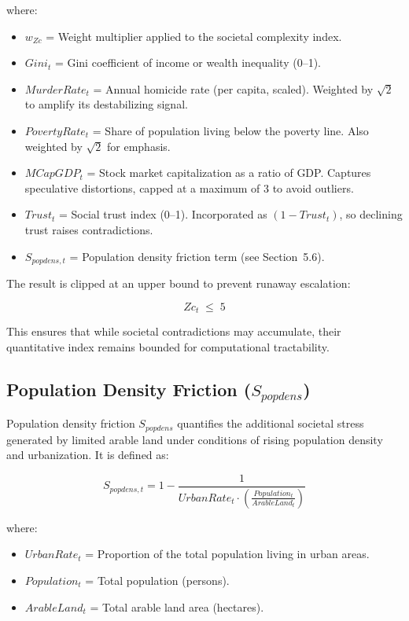 \documentclass[12pt,a4paper]{article}
\begin{document}
\noindent where:
\begin{itemize}
    \item $w_{Zc}$ = Weight multiplier applied to the societal complexity index.
    \item $Gini_t$ = Gini coefficient of income or wealth inequality (0–1).
    \item $MurderRate_t$ = Annual homicide rate (per capita, scaled). 
          Weighted by $\sqrt{2}$ to amplify its destabilizing signal.
    \item $PovertyRate_t$ = Share of population living below the poverty line. 
          Also weighted by $\sqrt{2}$ for emphasis.
    \item $MCapGDP_t$ = Stock market capitalization as a ratio of GDP. 
          Captures speculative distortions, capped at a maximum of $3$ to avoid outliers.
    \item $Trust_t$ = Social trust index (0–1). Incorporated as $(1 - Trust_t)$, 
          so declining trust raises contradictions.
    \item $S_{popdens,t}$ = Population density friction term (see Section~5.6).
\end{itemize}

\noindent The result is clipped at an upper bound to prevent runaway escalation:

\begin{equation}
Zc_t \; \leq \; 5
\end{equation}

\noindent This ensures that while societal contradictions may accumulate, their 
quantitative index remains bounded for computational tractability.
\subsection{Population Density Friction (\texorpdfstring{$S_{popdens}$}{Spopdens})}

Population density friction $S_{popdens}$ quantifies the additional societal stress 
generated by limited arable land under conditions of rising population density 
and urbanization. It is defined as:

\begin{equation}
S_{popdens,t} = 1 - \frac{1}{UrbanRate_t \cdot \left( \frac{Population_t}{ArableLand_t} \right)}
\end{equation}

\noindent where:
\begin{itemize}
    \item $UrbanRate_t$ = Proportion of the total population living in urban areas.
    \item $Population_t$ = Total population (persons).
    \item $ArableLand_t$ = Total arable land area (hectares).
\end{itemize}
\end{document}
